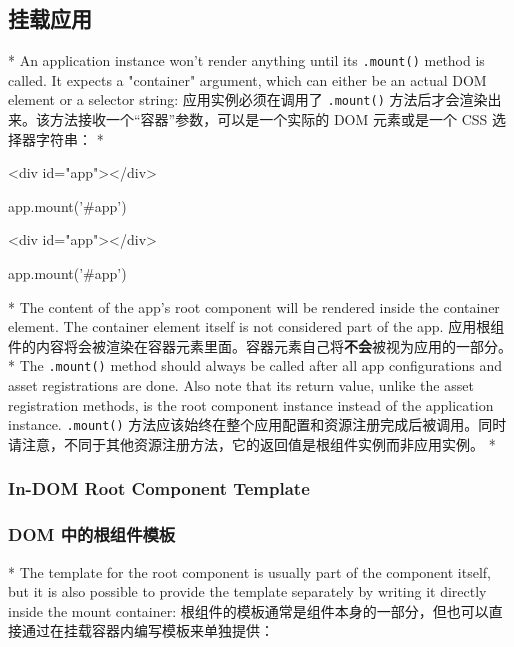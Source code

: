 \begin{paracol}{2}
\subsection{挂载应用}
\switchcolumn[0]*%
An application instance won't render anything until its
\texttt{.mount()} method is called. It expects a "container" argument,
which can either be an actual DOM element or a selector string:
\switchcolumn
应用实例必须在调用了 \texttt{.mount()}
方法后才会渲染出来。该方法接收一个``容器''参数，可以是一个实际的 DOM
元素或是一个 CSS 选择器字符串：
\switchcolumn[0]*%
\begin{codeHtml}
<div id="app"></div>
\end{codeHtml}
\begin{codeJs}
app.mount('#app')
\end{codeJs}
\switchcolumn
\begin{codeHtml}
<div id="app"></div>
\end{codeHtml}
\begin{codeJs}
app.mount('#app')
\end{codeJs}
\switchcolumn[0]*%
The content of the app's root component will be rendered inside the
container element. The container element itself is not considered part
of the app.
\switchcolumn
应用根组件的内容将会被渲染在容器元素里面。容器元素自己将\textbf{不会}被视为应用的一部分。
\switchcolumn[0]*%
The \texttt{.mount()} method should always be called after all app
configurations and asset registrations are done. Also note that its
return value, unlike the asset registration methods, is the root
component instance instead of the application instance.
\switchcolumn
\texttt{.mount()}
方法应该始终在整个应用配置和资源注册完成后被调用。同时请注意，不同于其他资源注册方法，它的返回值是根组件实例而非应用实例。
\switchcolumn[0]*%
\subsubsection{In-DOM Root Component Template}
\switchcolumn
\subsubsection{DOM 中的根组件模板}
\switchcolumn[0]*%
The template for the root component is usually part of the component
itself, but it is also possible to provide the template separately by
writing it directly inside the mount container:
\switchcolumn
根组件的模板通常是组件本身的一部分，但也可以直接通过在挂载容器内编写模板来单独提供：


\end{paracol}
